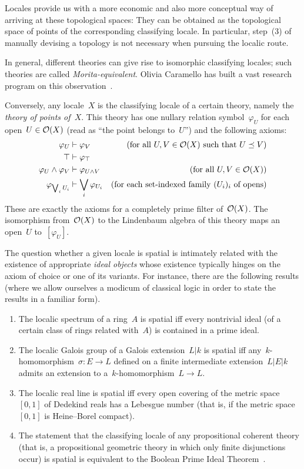 \documentclass{ws-rv9x6}
\begin{document}
{\begin{remark}
Locales provide us with a more economic and also more conceptual way of
arriving at these topological spaces: They can be obtained as the topological
space of points of the corresponding classifying locale. In particular,
step~(3) of manually devising a topology is not necessary when pursuing the
localic route.
\end{remark}

In general, different theories can give rise to isomorphic classifying locales;
such theories are called \emph{Morita-equivalent}. Olivia Caramello has built a vast research program
on this observation~\cite{caramello:tst}.

Conversely, any locale~$X$ is the classifying locale of a certain theory, namely
the \emph{theory of points of~$X$}. This theory has one nullary relation
symbol~$\varphi_U$ for each open~$U \in \mathcal{O}(X)$ (read as ``the point belongs
to~$U$'') and the following axioms:
\begin{align*}
  \varphi_U &\vdash \varphi_V & \text{(for all~$U,V \in \mathcal{O}(X)$ such that~$U \preceq V$)} \\
  \top &\vdash \varphi_\top \\
  \varphi_U \wedge \varphi_V &\vdash \varphi_{U \wedge V} & \text{(for all~$U,V \in \mathcal{O}(X)$)} \\
  \varphi_{\bigvee_i U_i} &\vdash \bigvee_i \varphi_{U_i} & \text{(for each set-indexed family~$(U_i)_i$ of opens)}
\end{align*}
These are exactly the axioms for a completely prime filter of~$\mathcal{O}(X)$. The
isomorphism from~$\mathcal{O}(X)$ to the Lindenbaum algebra of this theory maps an
open~$U$ to~$[\varphi_U]$.

The question whether a given locale is spatial is intimately related with the
existence of appropriate \emph{ideal objects} whose existence typically hinges
on the axiom of choice or one of its variants. For instance, there are the
following results (where we allow ourselves a modicum of classical logic in
order to state the results in a familiar form).
\begin{enumerate}
\item The localic spectrum of a ring~$A$ is spatial iff every nontrivial ideal
(of a certain class of rings related with~$A$) is contained in a prime ideal.
\item The localic Galois group of a Galois extension~$L|k$ is spatial iff
any~$k$-homomorphism~$\sigma : E \to L$ defined on a finite intermediate
extension~$L|E|k$ admits an extension to a~$k$-homomorphism~$L \to L$.
\item The localic real line is spatial iff every open covering of the
metric space~$[0,1]$ of Dedekind reals has a Lebesgue number (that is, if the
metric space~$[0,1]$ is Heine--Borel compact).
\item The statement that the classifying locale of any propositional coherent
theory (that is, a propositional geometric theory in which only finite
disjunctions occur) is spatial is equivalent to the Boolean Prime Ideal
Theorem~\BPIT.
\end{enumerate}

}
\end{document}
